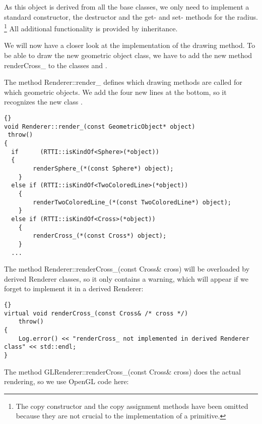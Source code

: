 As this object is derived from all the base classes, we only need to implement
a standard constructor, the destructor and the get- and set- methods for 
the radius.
\footnote{The copy constructor and the copy assignment methods
have been omitted because they are not crucial to the implementation of a
primitive.} All additional functionality is provided by inheritance.

We will now have a closer look at the implementation of the drawing method. 
To be able to draw the new geometric object class, we have to add the new
method renderCross\_ to the classes  and .

The method Renderer::render\_ defines which drawing methods are called for
which geometric objects. We add the four new lines at the bottom, 
so it recognizes the new class .

\begin{lstlisting}{}
void Renderer::render_(const GeometricObject* object)
 throw()
{
  if      (RTTI::isKindOf<Sphere>(*object))         
  { 
		renderSphere_(*(const Sphere*) object);
	}
  else if (RTTI::isKindOf<TwoColoredLine>(*object)) 
	{ 
		renderTwoColoredLine_(*(const TwoColoredLine*) object);
	}
  else if (RTTI::isKindOf<Cross>(*object))          
	{ 
		renderCross_(*(const Cross*) object);
	}
  ...
\end{lstlisting}

The method Renderer::renderCross\_(const Cross\& cross)
will be overloaded by derived Renderer classes, so it only
contains a warning, which will appear if we forget to 
implement it in a derived Renderer:

\begin{lstlisting}{}
virtual void renderCross_(const Cross& /* cross */)
	throw() 
{
	Log.error() << "renderCross_ not implemented in derived Renderer class" << std::endl;
}
\end{lstlisting}


The method GLRenderer::renderCross\_(const Cross\& cross)
does the actual rendering, so we use OpenGL code here:

